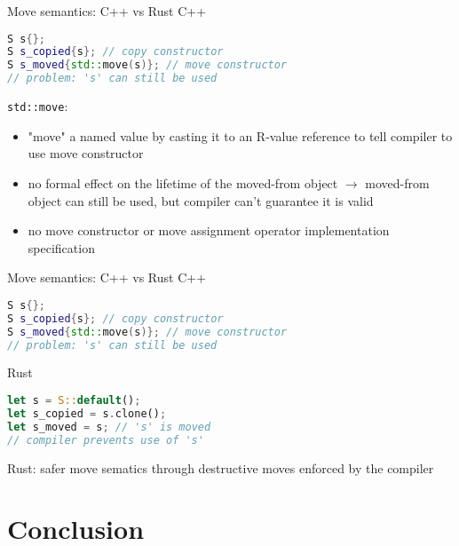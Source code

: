 \documentclass{beamer}
\begin{document}
\begin{frame}[fragile]{Move semantics: C++ vs Rust}
C++
\begin{lstlisting}[language=C++]
S s{};
S s_copied{s}; // copy constructor
S s_moved{std::move(s)}; // move constructor
// problem: 's' can still be used
\end{lstlisting}

\verb|std::move|:
\begin{itemize}
  \item "move" a named value by casting it to an R-value reference to tell compiler to use move constructor
  \item no formal effect on the lifetime of the moved-from object $\rightarrow$ moved-from object can still be used, but compiler can't guarantee it is valid
  \item no move constructor or move assignment operator implementation specification
\end{itemize}
\end{frame}


\begin{frame}[fragile]{Move semantics: C++ vs Rust}
C++
\begin{lstlisting}[language=C++]
S s{};
S s_copied{s}; // copy constructor
S s_moved{std::move(s)}; // move constructor
// problem: 's' can still be used
\end{lstlisting}

Rust
\begin{lstlisting}[language=Rust]
let s = S::default();
let s_copied = s.clone();
let s_moved = s; // 's' is moved
// compiler prevents use of 's'
\end{lstlisting}

Rust: safer move sematics through destructive moves enforced by the compiler
\end{frame}


\section{Conclusion}
\end{document}
